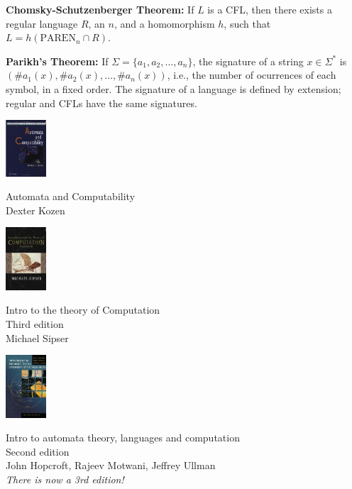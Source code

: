 \begin{frame}

{\bf Chomsky-Schutzenberger Theorem:} If $L$ is a CFL, then there
exists a regular language $R$, an $n$, and a homomorphism $h$, such
that $L=h(\text{PAREN}_n\cap R)$. 

{\bf Parikh's Theorem:} If $\Sigma=\{a_1,a_2,\ldots,a_n\}$, the
signature of a string $x\in\Sigma^*$ is $(\texttt{\#}a_1(x),
\texttt{\#}a_2(x),\ldots,\texttt{\#}a_n(x))$, i.e., the number of
ocurrences of each symbol, in a fixed order.  The signature of a
language is defined by extension; regular and CFLs have the same
signatures.
\end{frame}

\begin{frame}
\begin{minipage}{1.5cm}
\includegraphics[width=1.5cm]{figures/kozen.jpg}
\end{minipage}
\begin{minipage}{6cm}
Automata and Computability \\
Dexter Kozen
\end{minipage}

\begin{minipage}{1.5cm}
\includegraphics[width=1.5cm]{figures/sipser.jpg}
\end{minipage}
\begin{minipage}{6cm}
Intro to the theory of Computation \\
Third edition \\
Michael Sipser
\end{minipage}

\begin{minipage}{1.5cm}
\includegraphics[width=1.5cm]{figures/hopcroft.jpg}
\end{minipage}
\begin{minipage}{9cm}
Intro to automata theory, languages and computation \\
Second edition \\
John Hopcroft, Rajeev Motwani, Jeffrey Ullman \\
{\em There is now a 3rd edition!}
\end{minipage}
\end{frame}


